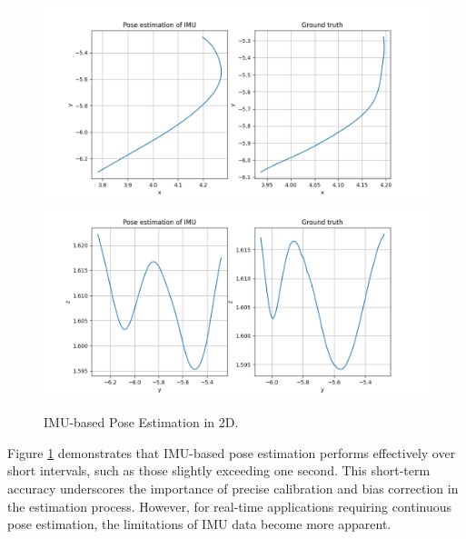 \begin{figure}[H]
    \centering
    \includegraphics[width=.9\linewidth]{Pictures/pose_est/IMU_est_pose_xy.png}
    \includegraphics[width=.9\linewidth]{Pictures/pose_est/IMU_est_pose_yz.png}
    \caption{IMU-based Pose Estimation in 2D.}
    \label{fig:pos_est1}
\end{figure}

Figure \ref{fig:pos_est1} demonstrates that IMU-based pose estimation performs effectively over short intervals, such as those slightly exceeding one second. This short-term accuracy underscores the importance of precise calibration and bias correction in the estimation process. However, for real-time applications requiring continuous pose estimation, the limitations of IMU data become more apparent.

